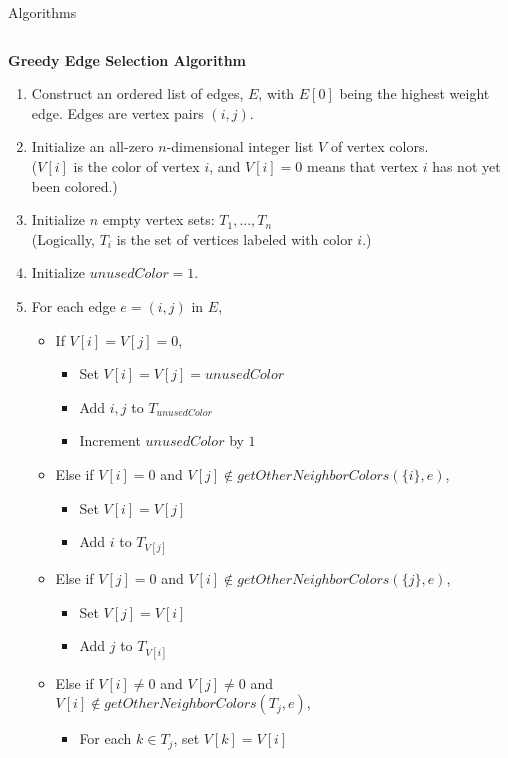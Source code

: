 \documentclass[serif,mathserif,final]{beamer}
\begin{document}
\begin{frame}{}
\begin{columns}[t]
\begin{column}{0.49\linewidth}
\begin{block}{\Huge Algorithms}
		\begin{columns}[t]
			\begin{column}{0.49\linewidth}

\begin{framed}
\noindent\textbf{\Large Greedy Edge Selection Algorithm}
\begin{enumerate}
\Large
\item Construct an ordered list of edges, $E$, with $E[0]$ being the highest weight edge. Edges are vertex pairs $(i,j)$.
\item Initialize an all-zero $n$-dimensional integer list $V$ of vertex colors. \\
($V[i]$ is the color of vertex $i$, and $V[i]=0$ means that vertex $i$ has not yet been colored.)
\item Initialize $n$ empty vertex sets: $T_1,...,T_n$\\
(Logically, $T_i$ is the set of vertices labeled with color $i$.)
\item Initialize $unusedColor=1$.
\item For each edge $e=(i,j)$ in $E$,
\begin{itemize}
\large
\item If $V[i]=V[j]=0$,
\begin{itemize}
\normalsize
\item Set $V[i]=V[j]=unusedColor$
\item Add $i,j$ to $T_{unusedColor}$
\item Increment $unusedColor$ by $1$
\end{itemize}
\item Else if $V[i]=0$ and $V[j]\notin getOtherNeighborColors(\{i\}, e)$,
\begin{itemize}
\normalsize
\item Set $V[i]=V[j]$
\item Add $i$ to $T_{V[j]}$
\end{itemize}
\item Else if $V[j]=0$ and $V[i]\notin getOtherNeighborColors(\{j\}, e)$,
\begin{itemize}
\normalsize
\item Set $V[j]=V[i]$
\item Add $j$ to $T_{V[i]}$
\end{itemize}
\item Else if  $V[i]\neq 0$ and $V[j]\neq 0$ and $V[i]\notin getOtherNeighborColors(T_j, e)$,
\begin{itemize}
\normalsize
\item For each $k\in T_j$, set $V[k]=V[i]$

\end{itemize}
\end{itemize}
\end{enumerate}
\end{framed}
\end{column}
\end{columns}
\end{block}
\end{column}
\end{columns}
\end{frame}
\end{document}
